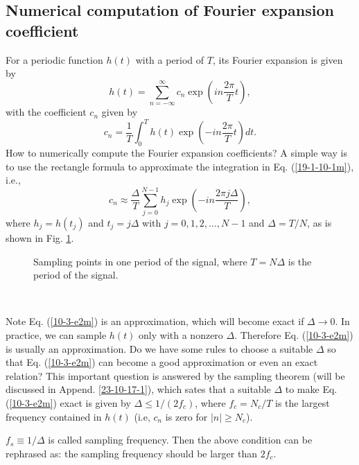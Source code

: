 \documentclass{article}
\begin{document}
\subsection{Numerical computation of Fourier expansion coefficient}

For a periodic function $h (t)$ with a period of $T$, its Fourier expansion is
given by
\begin{equation}
  h (t) = \sum_{n = - \infty}^{\infty} c_n \exp \left( i n \frac{2 \pi}{T} t
  \right),
\end{equation}
with the coefficient $c_n$ given by
\begin{equation}
  \label{19-1-10-1m} c_n = \frac{1}{T} \int_0^T h (t) \exp \left( - i n
  \frac{2 \pi}{T} t \right) d t.
\end{equation}
How to numerically compute the Fourier expansion coefficients? A simple way is
to use the rectangle formula to approximate the integration in Eq.
(\ref{19-1-10-1m}), i.e.,
\begin{equation}
  \label{10-3-e2m} c_n \approx \frac{\Delta}{T} \sum_{j = 0}^{N - 1} h_j \exp
  \left( - i n \frac{2 \pi j \Delta}{T} \right),
\end{equation}
where $h_j = h (t_j)$ and $t_j = j \Delta$ with $j = 0, 1, 2, \ldots, N - 1$
and $\Delta = T / N$, as is shown in Fig. \ref{16-2-25}.

\begin{figure}[h]
  \caption{\label{16-2-25}Sampling points in one period of the signal, where
  $T = N \Delta$ is the period of the signal.}
\end{figure}

\

Note Eq. (\ref{10-3-e2m}) is an approximation, which will become exact if
$\Delta \rightarrow 0$. In practice, we can sample $h (t)$ only with a nonzero
$\Delta$. Therefore Eq. (\ref{10-3-e2m}) is usually an approximation. Do we
have some rules to choose a suitable $\Delta$ so that Eq. (\ref{10-3-e2m}) can
become a good approximation or even an exact relation? This important question
is answered by the sampling theorem (will be discussed in Append.
\ref{23-10-17-1}), which sates that a suitable $\Delta$ to make Eq.
(\ref{10-3-e2m}) exact is given by $\Delta \leqslant 1 / (2 f_c)$, where $f_c
= N_c / T$ is the largest frequency contained in $h (t)$ (i.e, $c_n$ is zero
for $| n | \geqslant N_c$).

$f_s \equiv 1 / \Delta$ is called sampling frequency. Then the above
condition can be rephrased as: the sampling frequency should be larger than $2
f_c$.
\end{document}
